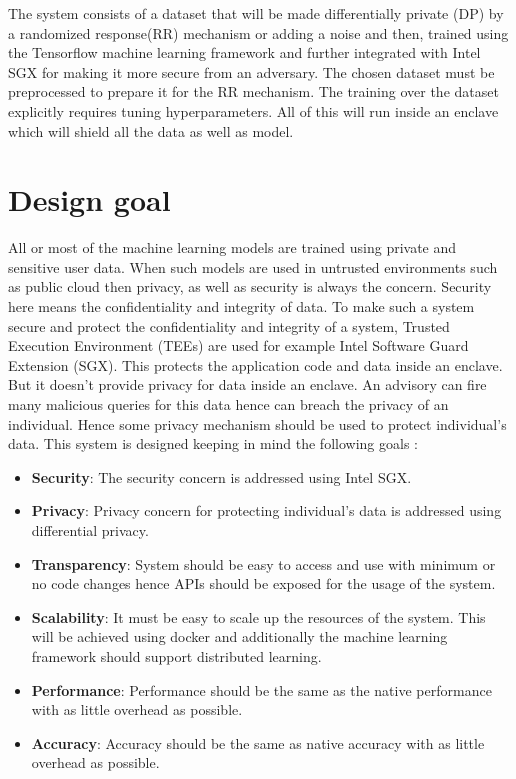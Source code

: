 The system consists of a dataset that will be made differentially private (DP) by a randomized response(RR) mechanism or adding a noise and then, trained using the Tensorflow machine learning framework and further integrated with Intel SGX for making it more secure from an adversary. The chosen dataset must be preprocessed to prepare it for the RR mechanism. The training over the dataset explicitly requires tuning hyperparameters. All of this will run inside an enclave which will shield all the data as well as model. 
\section{Design goal}
All or most of the machine learning models are trained using private and sensitive user data. When such models are used in untrusted environments such as public cloud then privacy, as well as security is always the concern. Security here means the confidentiality and integrity of data. To make such a system secure and protect the confidentiality and integrity of a system, Trusted Execution Environment (TEEs) are used for example Intel Software Guard Extension (SGX). This protects the application code and data inside an enclave. But it doesn't provide privacy for data inside an enclave. An advisory can fire many malicious queries for this data hence can breach the privacy of an individual. Hence some privacy mechanism should be used to protect individual's data. This system is designed keeping in mind the following goals :
\begin{itemize}
  \item \textbf{Security}: The security concern is addressed using Intel SGX.
  \vspace{-0.3cm}\item \textbf{Privacy}: Privacy concern for protecting individual's data is addressed using differential privacy.
  \vspace{-0.3cm}\item \textbf{Transparency}: System should be easy to access and use with minimum or no code changes hence APIs should be exposed for the usage of the system.
  \vspace{-0.3cm}\item \textbf{Scalability}: It must be easy to scale up the resources of the system. This will be achieved using docker and additionally the machine learning framework should support distributed learning.
  \vspace{-0.3cm}\item \textbf{Performance}: Performance should be the same as the native performance with as little overhead as possible.
  \vspace{-0.3cm}\item \textbf{Accuracy}: Accuracy should be the same as native accuracy with as little overhead as possible.
\end{itemize} 
